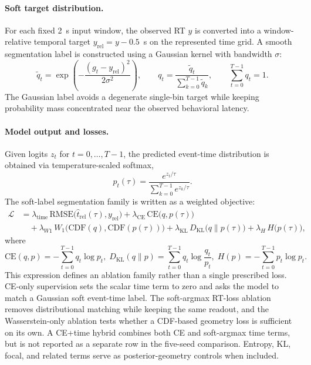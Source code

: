 \documentclass[12pt]{article}
\begin{document}
\paragraph{Soft target distribution.}
For each fixed 2~s input window, the observed RT \(y\) is converted into a
window-relative temporal target \(y_{\mathrm{rel}}=y-0.5\)~s on the represented
time grid.
A smooth segmentation label is constructed using a Gaussian kernel with bandwidth $\sigma$:
\begin{equation}
\label{eq:rt_soft_target}
\tilde q_t=\exp\left(-\frac{(g_t-y_{\mathrm{rel}})^2}{2\sigma^2}\right),\qquad
q_t=\frac{\tilde q_t}{\sum_{k=0}^{T-1}\tilde q_k},\qquad
\sum_{t=0}^{T-1} q_t=1.
\end{equation}
The Gaussian label avoids a degenerate single-bin target while keeping probability mass concentrated near the observed behavioral latency.

\paragraph{Model output and losses.}
Given logits $z_t$ for $t=0,\dots,T-1$, the predicted event-time distribution is obtained via temperature-scaled softmax,
\begin{equation}
\label{eq:rt_pred_dist}
p_t(\tau)=\frac{e^{z_t/\tau}}{\sum_{k=0}^{T-1} e^{z_k/\tau}}.
\end{equation}
The soft-label segmentation family is written as a weighted objective:
\begin{equation}
\label{eq:rt_loss}
\begin{aligned}
\mathcal{L}
&= \lambda_{\text{time}}\,\mathrm{RMSE}\big(\hat t_{\mathrm{rel}}(\tau), y_{\mathrm{rel}}\big)
 + \lambda_{\text{CE}}\,\mathrm{CE}\big(q, p(\tau)\big) \\
&\quad + \lambda_{W1}\,W_1\big(\mathrm{CDF}(q), \mathrm{CDF}(p(\tau))\big)
 + \lambda_{\text{KL}}\,D_{\mathrm{KL}}\big(q\|p(\tau)\big)
 + \lambda_{H}\,H\big(p(\tau)\big),
\end{aligned}
\end{equation}
where  
\begin{equation*}
\mathrm{CE}(q,p)=-\sum_{t=0}^{T-1} q_t \log p_t, \;
D_{\mathrm{KL}}(q\|p)=\sum_{t=0}^{T-1} q_t \log\frac{q_t}{p_t}, \;
H(p)=-\sum_{t=0}^{T-1} p_t \log p_t.
\end{equation*}
This expression defines an ablation family rather than a single prescribed loss. CE-only supervision sets the scalar time term to zero and asks the model to match a Gaussian soft event-time label. The soft-argmax RT-loss ablation removes distributional matching while keeping the same readout, and the Wasserstein-only ablation tests whether a CDF-based geometry loss is sufficient on its own. A CE+time hybrid combines both CE and soft-argmax time terms, but is not reported as a separate row in the five-seed comparison. Entropy, KL, focal, and related terms serve as posterior-geometry controls when included.
\end{document}
